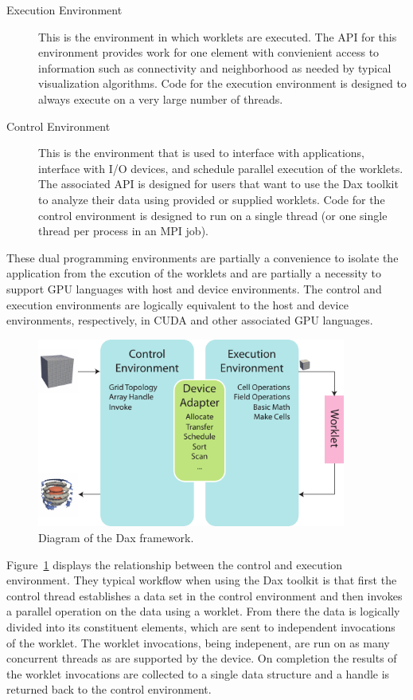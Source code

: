 \begin{description}
\item[Execution Environment]  This is the
  environment in which worklets are executed. The API for this environment
  provides work for one element with convienient access to information such
  as connectivity and neighborhood as needed by typical visualization
  algorithms. Code for the execution environment is designed to always
  execute on a very large number of threads.
\item[Control Environment]  This is the
  environment that is used to interface with applications, interface with
  I/O devices, and schedule parallel execution of the worklets. The
  associated API is designed for users that want to use the Dax toolkit to
  analyze their data using provided or supplied worklets. Code for the
  control environment is designed to run on a single thread (or one single
  thread per process in an MPI job).
\end{description}

These dual programming environments are partially a convenience to isolate
the application from the excution of the worklets and are partially a
necessity to support GPU languages with host and device environments. The
control and execution environments are logically equivalent to the host and
device environments, respectively, in CUDA and other associated
GPU languages.

\begin{figure}
  \centering
  \includegraphics[width=4in]{images/DaxDiagram}
  \caption{Diagram of the Dax framework.}
  \label{fig:DaxDiagram}
\end{figure}

Figure~\ref{fig:DaxDiagram} displays the relationship between the control
and execution environment. They typical workflow when using the Dax toolkit
is that first the control thread establishes a data set in the control
environment and then invokes a parallel operation on the data using a
worklet. From there the data is logically divided into its constituent
elements, which are sent to independent invocations of the worklet. The
worklet invocations, being indepenent, are run on as many concurrent
threads as are supported by the device. On completion the results of the
worklet invocations are collected to a single data structure and a handle
is returned back to the control environment.



